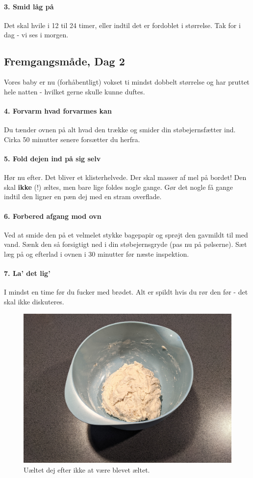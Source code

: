 \paragraph*{3. Smid låg på}
Det skal hvile i 12 til 24 timer, eller indtil det er fordoblet i størrelse. Tak for i dag - vi ses i morgen.

\subsection{Fremgangsmåde, Dag 2}
Vores baby er nu (forhåbentligt) vokset ti mindst dobbelt størrelse og har pruttet hele natten - hvilket gerne skulle kunne duftes.

\paragraph*{4. Forvarm hvad forvarmes kan}
Du tænder ovnen på alt hvad den trække og smider din støbejernsfætter ind. Cirka 50 minutter senere forsætter du herfra.

\paragraph*{5. Fold dejen ind på sig selv}
Hør nu efter. Det bliver et klisterhelvede. Der skal masser af mel på bordet! Den skal \textbf{ikke} (!) æltes, men bare lige foldes nogle gange. Gør det nogle få gange indtil den ligner en pæn dej med en stram overflade.

\paragraph*{6. Forbered afgang mod ovn}
Ved at smide den på et velmelet stykke bagepapir og sprøjt den gavmildt til med vand. Sænk den så forsigtigt ned i din støbejernsgryde (pas nu på pølserne). Sæt læg på og efterlad i ovnen i 30 minutter før næste inspektion.

\paragraph*{7. La' det lig'}
I mindst en time før du fucker med brødet. Alt er spildt hvis du rør den før - det skal ikke diskuteres.

\begin{figure}[h]
	\centering
	\includegraphics[width=\linewidth]{figs/no-knead-bread-after-not-kneading}
	\caption{Uæltet dej efter ikke at være blevet æltet.}
	\label{fig:no-knead-bread-after-not-kneading}
\end{figure}
